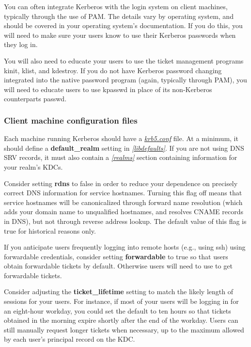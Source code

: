 \documentclass[letterpaper,10pt,english]{sphinxmanual}
\begin{document}
You can often integrate Kerberos with the login system on client
machines, typically through the use of PAM.  The details vary by
operating system, and should be covered in your operating system's
documentation.  If you do this, you will need to make sure your users
know to use their Kerberos passwords when they log in.

You will also need to educate your users to use the ticket management
programs kinit, klist, and kdestroy.  If you do not have Kerberos
password changing integrated into the native password program (again,
typically through PAM), you will need to educate users to use kpasswd
in place of its non-Kerberos counterparts passwd.


\subsubsection{Client machine configuration files}
\label{admin/install_clients:client-machine-configuration-files}
Each machine running Kerberos should have a {\hyperref[admin/conf_files/krb5_conf:krb5-conf-5]{\emph{krb5.conf}}} file.
At a minimum, it should define a \textbf{default\_realm} setting in
{\hyperref[admin/conf_files/krb5_conf:libdefaults]{\emph{{[}libdefaults{]}}}}.  If you are not using DNS SRV records, it must
also contain a {\hyperref[admin/conf_files/krb5_conf:realms]{\emph{{[}realms{]}}}} section containing information for your
realm's KDCs.

Consider setting \textbf{rdns} to false in order to reduce your dependence
on precisely correct DNS information for service hostnames.  Turning
this flag off means that service hostnames will be canonicalized
through forward name resolution (which adds your domain name to
unqualified hostnames, and resolves CNAME records in DNS), but not
through reverse address lookup.  The default value of this flag is
true for historical reasons only.

If you anticipate users frequently logging into remote hosts
(e.g., using ssh) using forwardable credentials, consider setting
\textbf{forwardable} to true so that users obtain forwardable tickets by
default.  Otherwise users will need to use  to get
forwardable tickets.

Consider adjusting the \textbf{ticket\_lifetime} setting to match the likely
length of sessions for your users.  For instance, if most of your
users will be logging in for an eight-hour workday, you could set the
default to ten hours so that tickets obtained in the morning expire
shortly after the end of the workday.  Users can still manually
request longer tickets when necessary, up to the maximum allowed by
each user's principal record on the KDC.
\end{document}
